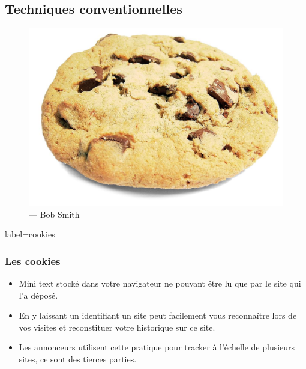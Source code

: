 \documentclass{beamer}
\begin{document}
    \subsection{Techniques conventionnelles}
        \begin{frame}
            \begin{center}
                \begin{figure}
                    \includegraphics[scale=0.15]{img/cookie.jpg}
                    \caption{\cc --- Bob Smith}
                \end{figure}
            \end{center}
        \end{frame}
        \begin{frame}{label=cookies}
            \frametitle{Les cookies}
            \begin{center}
                \begin{itemize}
                    \item Mini text stocké dans votre navigateur ne pouvant être lu que par le site qui l'a déposé.
                    \item En y laissant un identifiant un site peut facilement vous reconnaître lors de vos visites et reconstituer votre historique sur ce site.
                    \item Les annonceurs utilisent cette pratique pour tracker à l'échelle de plusieurs sites, ce sont des tierces parties.
                \end{itemize}
            \end{center}
        \end{frame}
\end{document}
